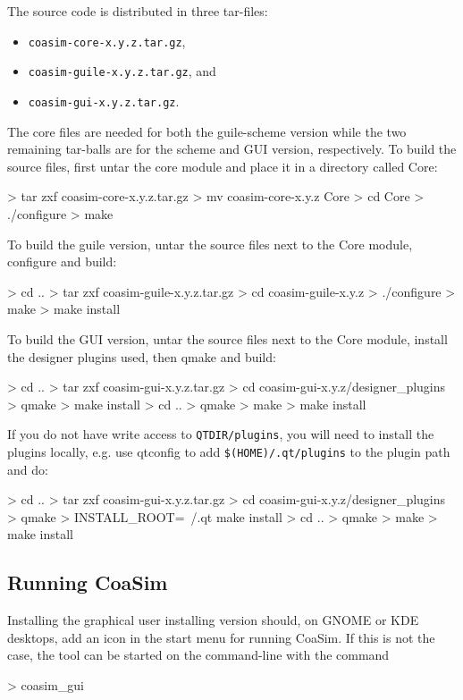 \documentclass{manual}
\begin{document}
The source code is distributed in three tar-files:
\begin{itemize}
\item \verb?coasim-core-x.y.z.tar.gz?,
\item \verb?coasim-guile-x.y.z.tar.gz?, and
\item \verb?coasim-gui-x.y.z.tar.gz?.
\end{itemize}

The core files are needed for both the guile-scheme version while the
two remaining tar-balls are for the scheme and GUI version,
respectively.  To build the source files, first untar the core module
and place it in a directory called Core:

\begin{code}
> tar zxf coasim-core-x.y.z.tar.gz
> mv coasim-core-x.y.z Core
> cd Core
> ./configure
> make
\end{code}

To build the guile version, untar the source files next to the Core
module, configure and build:

\begin{code}
> cd ..
> tar zxf coasim-guile-x.y.z.tar.gz
> cd coasim-guile-x.y.z
> ./configure
> make
> make install
\end{code}

To build the GUI version, untar the source files next to the Core
module, install the designer plugins used, then qmake and build:

\begin{code}
> cd ..
> tar zxf coasim-gui-x.y.z.tar.gz
> cd coasim-gui-x.y.z/designer_plugins
> qmake
> make install
> cd ..
> qmake
> make
> make install
\end{code}

If you do not have write access to \verb?QTDIR/plugins?, you will need
to install the plugins locally, e.g. use qtconfig to add
\verb?$(HOME)/.qt/plugins? to the plugin path and do:

\begin{code}
> cd ..
> tar zxf coasim-gui-x.y.z.tar.gz
> cd coasim-gui-x.y.z/designer_plugins
> qmake
> INSTALL_ROOT=~/.qt make install
> cd ..
> qmake
> make
> make install
\end{code}


\subsection{Running CoaSim}

Installing the graphical user installing version should, on GNOME or
KDE desktops, add an icon in the start menu for running CoaSim.  If
this is not the case, the tool can be started on the command-line with
the command
\begin{code}
> coasim_gui
\end{code}
\end{document}
